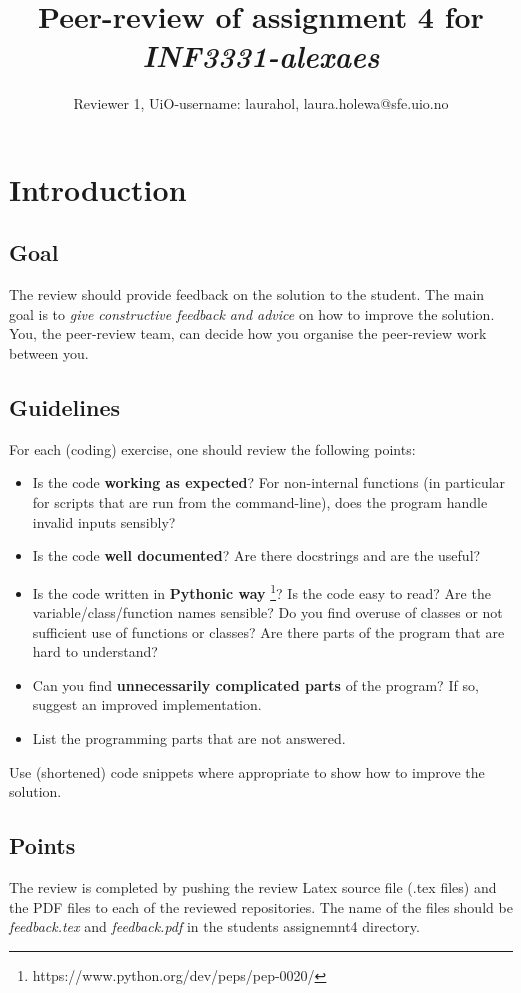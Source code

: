 \documentclass[a4paper]{article}
\title{Peer-review of assignment 4 for \textit{INF3331-alexaes}}
\author{Reviewer 1, UiO-username: laurahol, {laura.holewa@sfe.uio.no} \\}
\begin{document}
\maketitle

\section{Introduction}
\subsection{Goal}
The review should provide feedback on the solution to the student. The main goal is to \emph{give constructive feedback and advice} on how to improve the solution. You, the peer-review team, can decide how you organise the peer-review work between you. 

\subsection{Guidelines}\label{sec:general_review}
For each (coding) exercise, one should review the following points:

\begin{itemize}
  \item Is the code \textbf{working as expected}? For non-internal functions (in particular for scripts that are run from the command-line), does the program handle invalid inputs sensibly?
  \item Is the code \textbf{well documented}? Are there docstrings and are the useful?
  \item Is the code written in \textbf{Pythonic way} \footnote{https://www.python.org/dev/peps/pep-0020/}? Is the code easy to read? Are the variable/class/function names sensible? Do you find overuse of classes or not sufficient use of functions or classes? Are there parts of the program that are hard to understand? 
  \item Can you find \textbf{unnecessarily complicated parts} of the program? If so, suggest an improved implementation.
  \item List the programming parts that are not answered.
\end{itemize}
Use (shortened) code snippets where appropriate to show how to improve the solution. 

\subsection{Points}
The review is completed by pushing the review Latex source file (.tex files) and the PDF files to each of the reviewed repositories. The name of the files should be \emph{feedback.tex} and \emph{feedback.pdf} in the students assignemnt4 directory.
\end{document}
